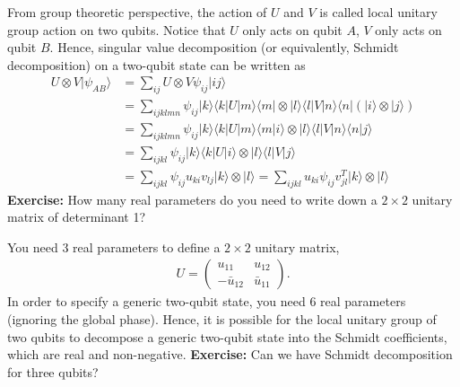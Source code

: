 \documentclass{beamer}
\begin{document}
\begin{frame}
\justify
From group theoretic perspective, the action of $U$ and $V$ is called local unitary group action on two qubits. Notice that $U$ only acts on qubit $A$, $V$ only acts on qubit $B$. Hence, singular value decomposition (or equivalently, Schmidt decomposition) on a two-qubit state can be written as
\begin{align}
U \otimes V |\psi_{AB}\rangle & = \sum_{ij} U \otimes V \psi_{ij} |ij\rangle \nonumber \\
& = \sum_{ijklmn} \psi_{ij} |k\rangle \langle k| U |m\rangle \langle m| \otimes |l\rangle \langle l| V |n\rangle \langle n| (|i\rangle \otimes |j\rangle) \nonumber \\
& = \sum_{ijklmn} \psi_{ij} |k\rangle \langle k| U |m\rangle \langle m| i\rangle \otimes |l\rangle \langle l| V |n\rangle \langle n|j\rangle \nonumber \\
& = \sum_{ijkl} \psi_{ij} |k\rangle \langle k| U |i\rangle \otimes |l\rangle \langle l| V |j\rangle \nonumber \\
& = \sum_{ijkl} \psi_{ij} u_{ki} v_{lj} |k\rangle \otimes |l\rangle = \sum_{ijkl} u_{ki} \psi_{ij} v^T_{jl} |k\rangle \otimes |l\rangle
\end{align}
\vfill
\textbf{Exercise:} How many real parameters do you need to write down a $2 \times 2$ unitary matrix of determinant 1?
\end{frame}

\begin{frame}
\justify
You need 3 real parameters to define a $2 \times 2$ unitary matrix,
\begin{align}
U = \begin{pmatrix} u_{11} & u_{12} \\ -\bar{u}_{12} & \bar{u}_{11} \end{pmatrix}.
\end{align}
\vfill
In order to specify a generic two-qubit state, you need 6 real parameters (ignoring the global phase).
\vfill
Hence, it is possible for the local unitary group of two qubits to decompose a generic two-qubit state into the Schmidt coefficients, which are real and non-negative.
\vfill
\textbf{Exercise:} Can we have Schmidt decomposition for three qubits?
\end{frame}
\end{document}
